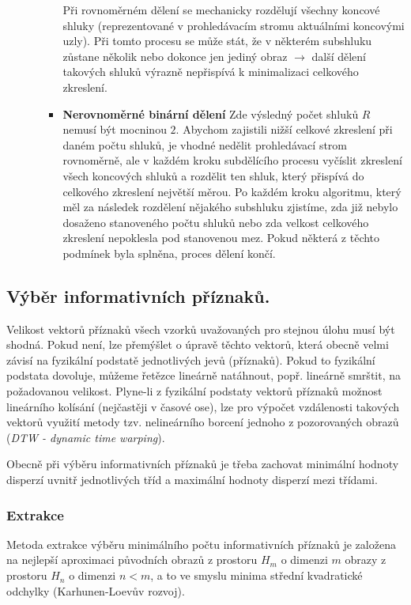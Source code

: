 \begin{enumerate}[label=(\Alph*)]
\begin{enumerate}[label=\arabic*.]
\begin{itemize}
Při rovnoměrném dělení se mechanicky rozdělují všechny koncové shluky (reprezentované v prohledávacím stromu aktuálními koncovými uzly). Při tomto procesu se může stát, že v některém subshluku zůstane několik nebo dokonce jen jediný obraz $ \to $ další dělení takových shluků výrazně nepřispívá k minimalizaci celkového zkreslení.

\item \textbf{Nerovnoměrné binární dělení}
Zde výsledný počet shluků $ R $ nemusí být mocninou $ 2 $. Abychom zajistili nižší celkové zkreslení při daném počtu shluků, je vhodné nedělit prohledávací strom rovnoměrně, ale v každém kroku subdělícího procesu vyčíslit zkreslení všech koncových shluků a rozdělit ten shluk, který přispívá do celkového zkreslení největší měrou. Po každém kroku algoritmu, který měl za následek rozdělení nějakého subshluku zjistíme, zda již nebylo dosaženo stanoveného počtu shluků nebo zda velkost celkového zkreslení nepoklesla pod stanovenou mez. Pokud některá z těchto podmínek byla splněna, proces dělení končí.

\end{itemize}
\end{enumerate}
\end{enumerate}


\subsection{Výběr informativních příznaků.}
Velikost vektorů příznaků všech vzorků uvažovaných pro stejnou úlohu musí být shodná. Pokud není, lze přemýšlet o úpravě těchto vektorů, která obecně velmi závisí na fyzikální podstatě jednotlivých jevů (příznaků). Pokud to fyzikální podstata dovoluje, můžeme řetězce lineárně natáhnout, popř. lineárně smrštit, na požadovanou velikost. Plyne-li z fyzikální podstaty vektorů příznaků možnost lineárního kolísání (nejčastěji v časové ose), lze pro výpočet vzdálenosti takových vektorů využití metody tzv. nelineárního borcení jednoho z pozorovaných obrazů (\textit{DTW - dynamic time warping}).

Obecně při výběru informativních příznaků je třeba zachovat minimální hodnoty disperzí uvnitř jednotlivých tříd a maximální hodnoty disperzí mezi třídami.

\subsubsection*{Extrakce}
Metoda extrakce výběru minimálního počtu informativních příznaků je založena na nejlepší aproximaci původních obrazů z prostoru $ H_m $ o dimenzi $ m $ obrazy z prostoru $ H_n $ o dimenzi $ n < m $, a to ve smyslu minima střední kvadratické odchylky (Karhunen-Loevův rozvoj).
\vspace{2cm}

